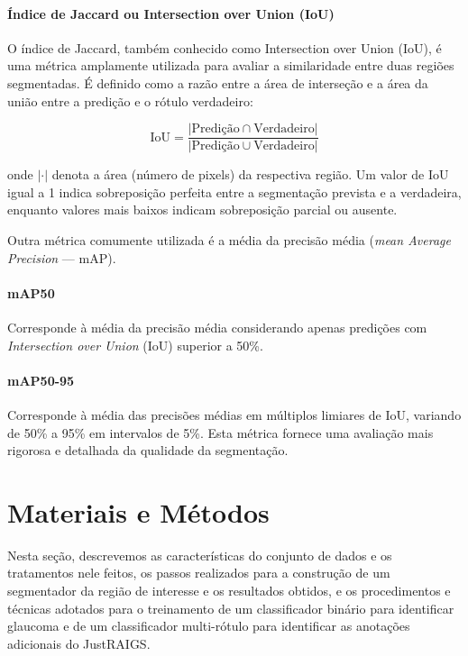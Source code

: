 \documentclass[12pt]{article}
\begin{document}
\paragraph{Índice de Jaccard ou Intersection over Union (IoU)}
O índice de Jaccard, também conhecido como Intersection over Union (IoU), é uma métrica amplamente utilizada para avaliar a similaridade entre duas regiões segmentadas. É definido como a razão entre a área de interseção e a área da união entre a predição e o rótulo verdadeiro:

\begin{equation}
\text{IoU} = \frac{|\text{Predição} \cap \text{Verdadeiro}|}{|\text{Predição} \cup \text{Verdadeiro}|}
\end{equation}

onde \( |\cdot| \) denota a área (número de pixels) da respectiva região. Um valor de IoU igual a 1 indica sobreposição perfeita entre a segmentação prevista e a verdadeira, enquanto valores mais baixos indicam sobreposição parcial ou ausente.

Outra métrica comumente utilizada é a média da precisão média (\emph{mean Average Precision} — mAP).

\paragraph{mAP50} Corresponde à média da precisão média considerando apenas predições com \emph{Intersection over Union} (IoU) superior a 50\%.

\paragraph{mAP50-95}  
Corresponde à média das precisões médias em múltiplos limiares de IoU, variando de 50\% a 95\% em intervalos de 5\%. Esta métrica fornece uma avaliação mais rigorosa e detalhada da qualidade da segmentação.


\section{Materiais e Métodos}
\label{sec:methodology}

Nesta seção, descrevemos as características do conjunto de dados e os tratamentos nele feitos, os passos realizados para a construção de um segmentador da região de interesse e os resultados obtidos, e os procedimentos e técnicas adotados para o treinamento de um classificador binário para identificar glaucoma e de um classificador multi-rótulo para identificar as anotações adicionais do JustRAIGS.
\end{document}
